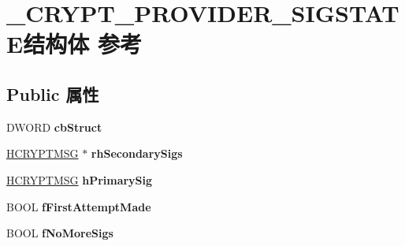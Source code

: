 \hypertarget{struct___c_r_y_p_t___p_r_o_v_i_d_e_r___s_i_g_s_t_a_t_e}{}\section{\+\_\+\+C\+R\+Y\+P\+T\+\_\+\+P\+R\+O\+V\+I\+D\+E\+R\+\_\+\+S\+I\+G\+S\+T\+A\+T\+E结构体 参考}
\label{struct___c_r_y_p_t___p_r_o_v_i_d_e_r___s_i_g_s_t_a_t_e}
\subsection*{Public 属性}
\begin{DoxyCompactItemize}
\item 
\mbox{\label{struct___c_r_y_p_t___p_r_o_v_i_d_e_r___s_i_g_s_t_a_t_e_a4fda1c9ecc8d07842d2f9388acd77e44}} 
D\+W\+O\+RD {\bfseries cb\+Struct}
\item 
\mbox{\label{struct___c_r_y_p_t___p_r_o_v_i_d_e_r___s_i_g_s_t_a_t_e_a5bad4602d6659f366213089e0024fd4a}} 
\hyperlink{interfacevoid}{H\+C\+R\+Y\+P\+T\+M\+SG} $\ast$ {\bfseries rh\+Secondary\+Sigs}
\item 
\mbox{\label{struct___c_r_y_p_t___p_r_o_v_i_d_e_r___s_i_g_s_t_a_t_e_a0f7514a30e397fbdee316baec6a33de0}} 
\hyperlink{interfacevoid}{H\+C\+R\+Y\+P\+T\+M\+SG} {\bfseries h\+Primary\+Sig}
\item 
\mbox{\label{struct___c_r_y_p_t___p_r_o_v_i_d_e_r___s_i_g_s_t_a_t_e_ac4f58c714a3e4a62a1a1f96ffbe6bc37}} 
B\+O\+OL {\bfseries f\+First\+Attempt\+Made}
\item 
\mbox{\label{struct___c_r_y_p_t___p_r_o_v_i_d_e_r___s_i_g_s_t_a_t_e_ac6be7719f220f5d1ea4f122ba9783019}} 
B\+O\+OL {\bfseries f\+No\+More\+Sigs}
\item 
\mbox{\label{struct___c_r_y_p_t___p_r_o_v_i_d_e_r___s_i_g_s_t_a_t_e_a3f8ec36608c146533c1993a29134832c}} 

\end{DoxyCompactItemize}
